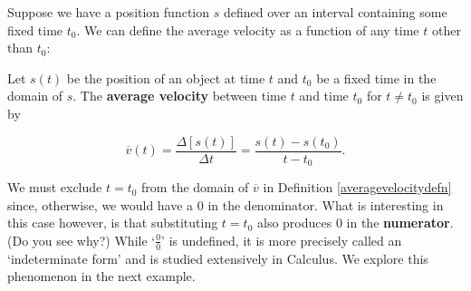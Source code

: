 \documentclass{ximera}
\begin{document}
Suppose we have a position function $s$ defined over an interval containing some fixed time $t_{0}$.  We can define the average velocity as a function of any time $t$ other than $t_{0}$:




\begin{definition} \label{averagevelocitydefn} Let $s(t)$ be the position of an object at time $t$ and $t_{0}$ be a fixed time in the domain of $s$.  The \textbf{average velocity} between time $t$ and time $t_{0}$  for $t \neq t_{0}$ is given by

\[ \overline{v}(t) = \frac{\Delta [s(t)]}{\Delta t} = \frac{s(t) - s(t_{0})}{t - t_{0}}. \]
\end{definition}




We must exclude $t = t_{0}$ from the domain of $\overline{v}$ in Definition \ref{averagevelocitydefn} since, otherwise, we would have a $0$ in the denominator.  What is interesting in this case however, is that substituting $t = t_{0}$ also produces $0$ in the \textbf{numerator}. (Do you see why?)  While `$\frac{0}{0}$' is undefined, it is more precisely called an `indeterminate form' and is studied extensively in Calculus.  We explore this phenomenon  in the next example.
\end{document}
